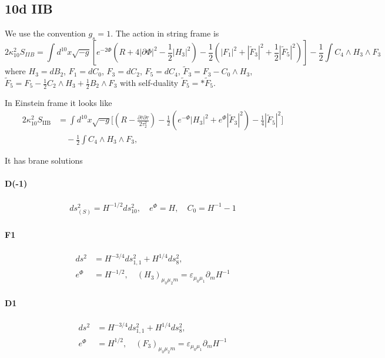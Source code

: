 \subsection{10d IIB}
\label{sec:10d IIB branes}

We use the convention $g_s = 1$.
The action in string frame is
\begin{equation}
2\kappa_{10}^2 S_{IIB} =
\int d^{10}x\sqrt{-g}\left[
    e^{-2\Phi}\left(R+4|\partial\Phi|^2-\frac{1}{2}|H_3|^2\right)
    -\frac{1}{2}\left(|F_1|^2+|\tilde{F}_3|^2+\frac{1}{2}|\tilde{F}_5|^2\right)
\right] - \frac{1}{2}\int C_4\wedge H_3\wedge F_3
\end{equation}
where $H_3 = dB_2$, $F_1 = dC_0$, $F_3 = dC_2$, $F_5 = dC_4$, $\tilde{F}_3 = F_3 - C_0 \wedge H_3$, $\tilde{F}_5 = F_5 - \frac{1}{2}C_2 \wedge H_3 + \frac{1}{2}B_2 \wedge F_3$ with self-duality $\tilde{F}_5 = *\tilde{F}_5$.

In Einstein frame it looks like
\begin{equation}
\begin{aligned}
2\kappa_{10}^2S_{\mathrm{IIB}}
&=\int d^{10}x\sqrt{-g}
\Bigg[\left(R-\frac{\partial\bar\tau\partial\tau}{2\tau_2^2}\right)-\frac{1}{2}\left(e^{-\Phi}|H_3|^2+e^{\Phi}|\tilde F_3|^2\right)-\frac{1}{4}|\tilde F_5|^2\Bigg]\\
&\quad-\frac{1}{2}\int C_4\wedge H_3\wedge F_3,
\label{einstein frame}
\end{aligned}
\end{equation}

It has brane solutions

\paragraph{D(-1)}
\begin{align}
ds_{(S)}^2 = H^{-1/2}ds_{10}^2,\quad
e^{\Phi} = H,\quad
C_0 = H^{-1}-1
\end{align}

\paragraph{F1}
\begin{align}
ds^2
&= H^{-3/4}ds_{1,1}^2 + H^{1/4}ds_8^2,\\
e^{\Phi}
&= H^{-1/2},\quad
(H_3)_{\mu_0\mu_2 m} = \varepsilon_{\mu_0 \mu_1} \partial_m H^{-1}
\end{align}

\paragraph{D1}
\begin{align}
ds^2 
&= H^{-3/4}ds_{1,1}^2 + H^{1/4}ds_8^2,\\
e^{\Phi}
&= H^{1/2},\quad
(F_3)_{\mu_0\mu_2 m} = \varepsilon_{\mu_0 \mu_1} \partial_m H^{-1}
\end{align}



